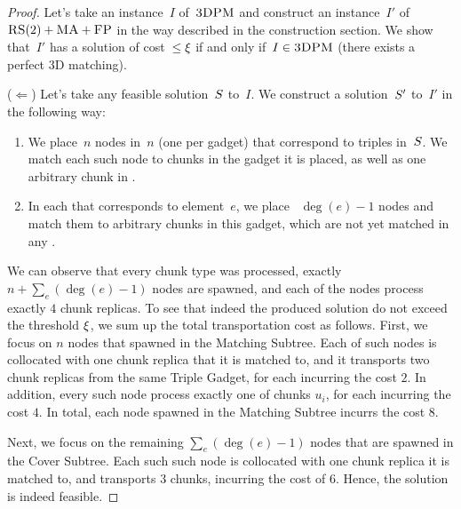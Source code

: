 \begin{proof}
  
  Let's take an instance~$I$ of~$\textsc{3DPM}$ and construct an instance~$I'$
  of~$\textsc{RS}(2)+\textsc{MA}+\textsc{FP}$ in the way described in the construction section.  We show that~$I'$
  has a solution of cost~$\leq \xi$ if and only if~$I \in \textsc{3DPM}$ (there
  exists a perfect 3D matching).

  ($\Leftarrow$) Let's take any feasible solution~$S$ to~$I$. We
  construct a solution~$S'$ to~$I'$ in the following way:
  \begin{enumerate}
    \item We place~$n$ nodes in~$n$ {\TripleGadgets} (one per gadget)
    that correspond to triples in~$S$. We match each such node
    to chunks in the gadget it is placed, as well as one arbitrary
    chunk in {\UnqSubtree}.
    \item In each {\ElGadget} that corresponds to element~$e$, we place
   ~$\deg(e) - 1$ nodes and match them to arbitrary chunks in this
    gadget, which are not yet matched in any {\TripleGadget}.
  \end{enumerate}

  We can observe that every chunk type was processed, exactly $n + \sum_e(\deg(e) - 1)$ nodes are spawned, and each of the nodes process exactly $4$ chunk replicas.
  To see that indeed the produced solution do not exceed the threshold $\xi$,
  we sum up the total transportation cost as follows.
  First, we focus on $n$ nodes that spawned in the Matching Subtree.
  Each of such nodes is collocated with one chunk replica that it is matched to,
  and it transports two chunk replicas from the same Triple Gadget, for each incurring the cost $2$.
  In addition, every such node process exactly one of chunks $u_i$, for each incurring the cost $4$.
  In total, each node spawned in the Matching Subtree incurrs the cost $8$.

  Next, we focus on the remaining $\sum_e(\deg(e)-1)$ nodes that are spawned in the Cover Subtree.
  Each such such node is collocated with one chunk replica it is matched to, and transports $3$ chunks, incurring the cost of $6$.
  Hence, the solution is indeed feasible.


\end{proof}
